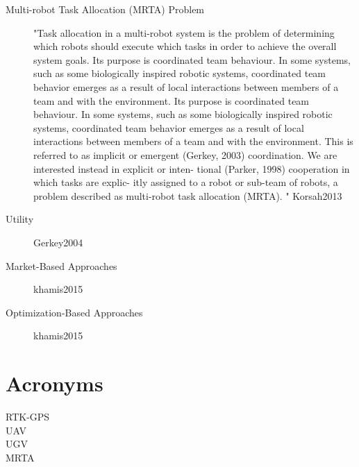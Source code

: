 \documentclass{article}
\begin{document}
\begin{description}
    \item[Multi-robot Task Allocation (MRTA) Problem] "Task allocation in a multi-robot system is the problem
    of determining which robots should execute which tasks
    in order to achieve the overall system goals. Its purpose
    is coordinated team behaviour. In some systems, such as
    some biologically inspired robotic systems, coordinated
    team behavior emerges as a result of local interactions
    between members of a team and with the environment. Its purpose
    is coordinated team behaviour. In some systems, such as
    some biologically inspired robotic systems, coordinated
    team behavior emerges as a result of local interactions
    between members of a team and with the environment.
    This is referred to as implicit or emergent (Gerkey, 2003)
    coordination. We are interested instead in explicit or inten-
    tional (Parker, 1998) cooperation in which tasks are explic-
    itly assigned to a robot or sub-team of robots, a problem
    described as multi-robot task allocation (MRTA).
    "
     Korsah2013
    \item[Utility] Gerkey2004
    \item[Market-Based Approaches] khamis2015
    \item[Optimization-Based Approaches] khamis2015 
\end{description}

\section{Acronyms}

\begin{description}
    \item[RTK-GPS] 
    \item[UAV] 
    \item[UGV] 
    \item[MRTA] 
\end{description}

\newpage


\end{document}
